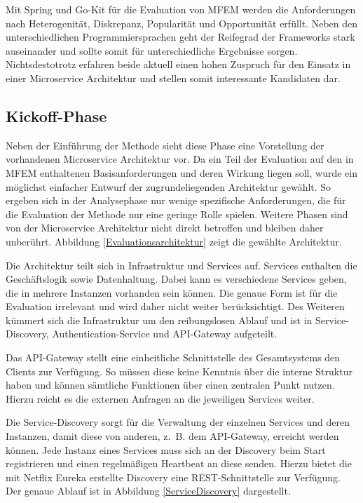 Mit Spring und Go-Kit für die Evaluation von \ac{MFEM} werden die Anforderungen nach Heterogenität, Diskrepanz, Popularität und Opportunität erfüllt. Neben den unterschiedlichen Programmiersprachen geht der Reifegrad der Frameworks stark auseinander und sollte somit für unterschiedliche Ergebnisse sorgen. Nichtsdestotrotz erfahren 
beide aktuell einen hohen Zuspruch für den Einsatz in einer Microservice Architektur und stellen somit interessante Kandidaten dar.

\subsection{Kickoff-Phase}

Neben der Einführung der Methode sieht diese Phase eine Vorstellung der vorhandenen Microservice Architektur vor.  
Da ein Teil der Evaluation auf den in \ac{MFEM} enthaltenen Basisanforderungen und deren Wirkung liegen soll, wurde ein möglichst einfacher Entwurf der zugrundeliegenden Architektur gewählt. So ergeben sich in der Analysephase nur wenige spezifische Anforderungen, die für die Evaluation der Methode nur eine geringe Rolle spielen. Weitere Phasen sind von der Microservice Architektur nicht direkt betroffen und bleiben daher unberührt. Abbildung \ref{Evaluationsarchitektur} zeigt die gewählte Architektur.


Die Architektur teilt sich in Infrastruktur und Services auf. Services enthalten die Geschäftslogik sowie Datenhaltung. Dabei kann es verschiedene Services geben, die in mehrere Instanzen vorhanden sein können. Die genaue Form ist für die Evaluation irrelevant und wird daher nicht weiter berücksichtigt. Des Weiteren kümmert sich die Infrastruktur um den reibungslosen Ablauf und ist in Service-Discovery, Authentication-Service und API-Gateway aufgeteilt.

Das API-Gateway stellt eine einheitliche Schnittstelle des Gesamtsystems den Clients zur Verfügung. So müssen diese keine Kenntnis über die interne Struktur haben und können sämtliche Funktionen über einen zentralen Punkt nutzen. Hierzu reicht es die externen Anfragen an die jeweiligen Services weiter.

Die Service-Discovery sorgt für die Verwaltung der einzelnen Services und deren Instanzen, damit diese von anderen, z.~B. dem API-Gateway, erreicht werden können. Jede Instanz eines Services muss sich an der Discovery beim Start registrieren und einen regelmäßigen Heartbeat an diese senden. Hierzu bietet die mit Netflix Eureka erstellte Discovery eine \ac{REST}-Schnittstelle zur Verfügung. Der genaue Ablauf ist in Abbildung \ref{ServiceDiscovery} dargestellt.

